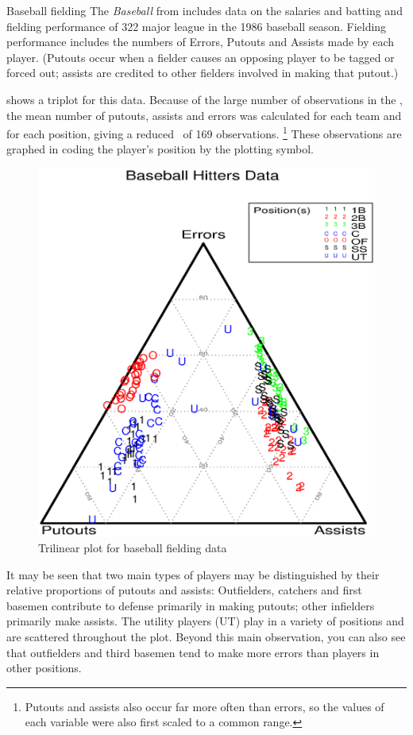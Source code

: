 \begin{Example}[baseball]{Baseball fielding}
The \emph{Baseball \Dset} from 
includes data on the salaries and batting and fielding performance of 322 major league in the 1986 baseball season.
Fielding performance includes the numbers of Errors,
Putouts and Assists made by each player.
(Putouts occur when a fielder causes an opposing player to be tagged or forced out;
assists are credited to other fielders involved in making that
putout.)

 shows a triplot for this data.
Because of the large number of observations in the \Dset,
the mean number of putouts, assists and errors was calculated for each team
and for each position, giving a reduced \Dset\ of 169 observations.%
\footnote{Putouts and assists also occur far more often than errors,
so the values of each variable were also first scaled to a common range.}
These observations are graphed in  coding the
player's position by the plotting symbol.

\begin{figure}[htb]
  \centering
  \includegraphics[scale=.6]{ch3/fig/basetri}
  \caption[Trilinear plot for baseball data]{Trilinear plot for baseball fielding data}\label{fig:basetri}
\end{figure}

It may be seen that two main types of
players may be distinguished by their relative proportions of
putouts and assists: Outfielders, catchers and first basemen
contribute to defense primarily in making putouts; other infielders
primarily make assists.  The utility players (UT) play in a variety
of positions and are scattered throughout the plot.
Beyond this main observation, you can also see that outfielders and
third basemen tend to make more errors than players in other positions.
\end{Example}


